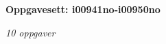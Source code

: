 \centerline{\bf Oppgavesett: i00941no-i00950no}
\vskip 10pt
\centerline{\it 10 oppgaver}\vskip 10pt
\vskip 10pt
